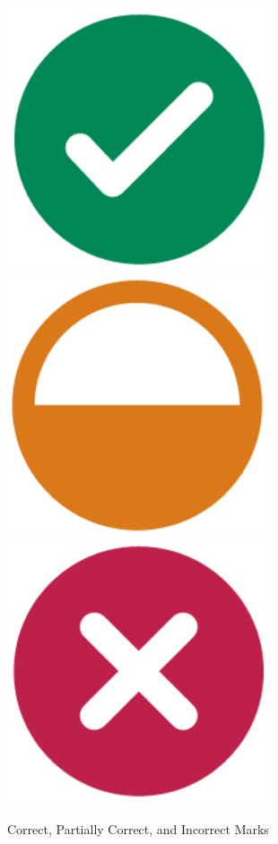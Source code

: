 \documentclass[
]{book}
\begin{document}
\begin{figure}

{\centering \includegraphics[width=3.06in]{images/scoringMarks/right-07} \includegraphics[width=3.06in]{images/scoringMarks/part-right-08} \includegraphics[width=3.06in]{images/scoringMarks/wrong-09} 

}

\caption{Correct, Partially Correct, and Incorrect Marks}\label{fig:marksb}
\end{figure}
\end{document}
